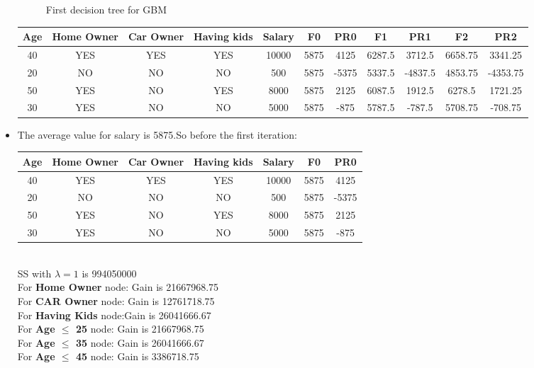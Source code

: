 \documentclass[a4paper]{article}
\begin{document}
\begin{itemize}
\begin{figure}[H]
        \caption{First decision tree for GBM}
        \label{P1}
    \end{figure}
    \begin{table}[htbp]
    \begin{tabular}{|c|c|c|c|c|c|c|c|c|c|c|}
        \hline
        Age & Home Owner & Car Owner & Having kids & Salary & F0 & PR0 & F1 & PR1 & F2 & PR2\\ \hline
        40 & YES & YES & YES & 10000 & 5875 & 4125 & 6287.5 & 3712.5 & 6658.75 & 3341.25\\ \hline
        20 & NO & NO & NO & 500 & 5875 & -5375 & 5337.5 & -4837.5 & 4853.75 & -4353.75\\ \hline
        50 & YES & NO & YES & 8000 & 5875 & 2125 & 6087.5 & 1912.5 & 6278.5 & 1721.25\\ \hline
        30 & YES & NO & NO & 5000 & 5875 & -875 & 5787.5 & -787.5 & 5708.75 & -708.75\\ \hline
        \end{tabular}
    \end{table}
    \item The average value for salary is 5875.So before the first iteration:
    \begin{table}[htbp]
        \begin{tabular}{|c|c|c|c|c|c|c|}
        \hline
        Age & Home Owner & Car Owner & Having kids & Salary & F0 & PR0 \\ \hline
        40 & YES & YES & YES & 10000 & 5875 & 4125 \\ \hline
        20 & NO & NO & NO & 500 & 5875 & -5375 \\ \hline
        50 & YES & NO & YES & 8000 & 5875 & 2125 \\ \hline
        30 & YES & NO & NO & 5000 & 5875 & -875 \\ \hline
        \end{tabular}
        \end{table}
        \\SS with $\lambda=1$ is 994050000
        \\For \textbf{Home Owner} node: Gain is 21667968.75
        \\For \textbf{CAR Owner} node: Gain is 12761718.75
        \\For \textbf{Having Kids} node:Gain is 26041666.67
        \\For \textbf{Age $\leq$ 25} node: Gain is 21667968.75
        \\For \textbf{Age $\leq$ 35} node: Gain is 26041666.67
        \\For \textbf{Age $\leq$ 45} node: Gain is 3386718.75

\end{itemize}
\end{document}
